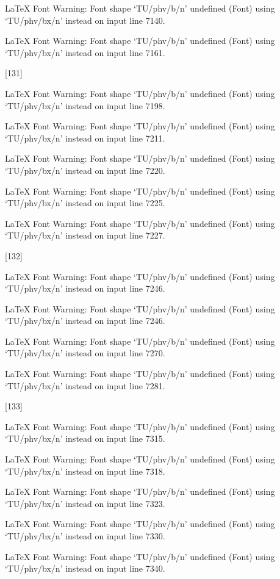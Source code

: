 LaTeX Font Warning: Font shape `TU/phv/b/n' undefined
(Font)              using `TU/phv/bx/n' instead on input line 7140.


LaTeX Font Warning: Font shape `TU/phv/b/n' undefined
(Font)              using `TU/phv/bx/n' instead on input line 7161.

[131]

LaTeX Font Warning: Font shape `TU/phv/b/n' undefined
(Font)              using `TU/phv/bx/n' instead on input line 7198.


LaTeX Font Warning: Font shape `TU/phv/b/n' undefined
(Font)              using `TU/phv/bx/n' instead on input line 7211.


LaTeX Font Warning: Font shape `TU/phv/b/n' undefined
(Font)              using `TU/phv/bx/n' instead on input line 7220.


LaTeX Font Warning: Font shape `TU/phv/b/n' undefined
(Font)              using `TU/phv/bx/n' instead on input line 7225.


LaTeX Font Warning: Font shape `TU/phv/b/n' undefined
(Font)              using `TU/phv/bx/n' instead on input line 7227.

[132]

LaTeX Font Warning: Font shape `TU/phv/b/n' undefined
(Font)              using `TU/phv/bx/n' instead on input line 7246.


LaTeX Font Warning: Font shape `TU/phv/b/n' undefined
(Font)              using `TU/phv/bx/n' instead on input line 7246.


LaTeX Font Warning: Font shape `TU/phv/b/n' undefined
(Font)              using `TU/phv/bx/n' instead on input line 7270.


LaTeX Font Warning: Font shape `TU/phv/b/n' undefined
(Font)              using `TU/phv/bx/n' instead on input line 7281.

[133]

LaTeX Font Warning: Font shape `TU/phv/b/n' undefined
(Font)              using `TU/phv/bx/n' instead on input line 7315.


LaTeX Font Warning: Font shape `TU/phv/b/n' undefined
(Font)              using `TU/phv/bx/n' instead on input line 7318.


LaTeX Font Warning: Font shape `TU/phv/b/n' undefined
(Font)              using `TU/phv/bx/n' instead on input line 7323.


LaTeX Font Warning: Font shape `TU/phv/b/n' undefined
(Font)              using `TU/phv/bx/n' instead on input line 7330.


LaTeX Font Warning: Font shape `TU/phv/b/n' undefined
(Font)              using `TU/phv/bx/n' instead on input line 7340.

